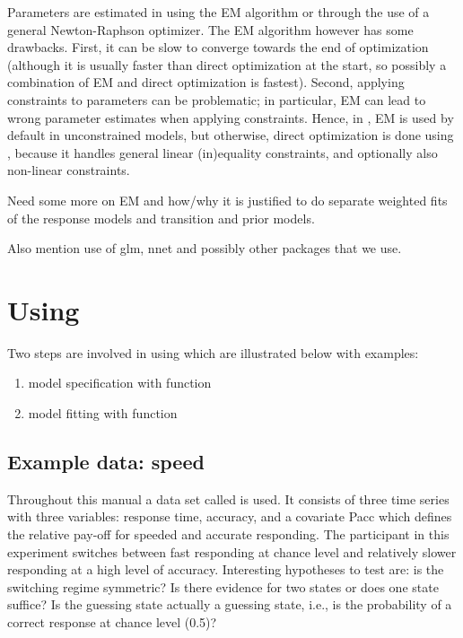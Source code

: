 \documentclass[article]{jss}
\begin{document}
Parameters are estimated in  using the EM algorithm or
through the use of a general Newton-Raphson optimizer.  The EM
algorithm however has some drawbacks.  First, it can be slow to
converge towards the end of optimization (although it is usually
faster than direct optimization at the start, so possibly a
combination of EM and direct optimization is fastest).  Second,
applying constraints to parameters can be problematic; in particular,
EM can lead to wrong parameter estimates when applying constraints.
Hence, in , EM is used by default in unconstrained
models, but otherwise, direct optimization is done using 
\cite{Tamura2007,Spellucci2002}, because it handles general linear
(in)equality constraints, and optionally also non-linear constraints.




Need some more on EM and how/why it is justified to do separate weighted
fits of the response models and transition and prior models. 

Also mention use of glm, nnet and possibly other packages that we use. 


\section{Using }

Two steps are involved in using  which are illustrated
below with examples:
\begin{enumerate}
	\item model specification with function 
	
	\item  model fitting with function 
\end{enumerate}

\subsection{Example data: speed}

Throughout this manual a data set called  is used.  It
consists of three time series with three variables: response time,
accuracy, and a covariate Pacc which defines the relative pay-off for
speeded and accurate responding.  The participant in this experiment
switches between fast responding at chance level and relatively slower
responding at a high level of accuracy.  Interesting hypotheses to
test are: is the switching regime symmetric?  Is there evidence for
two states or does one state suffice?  Is the guessing state actually
a guessing state, i.e., is the probability of a correct response at
chance level (0.5)?
\end{document}

